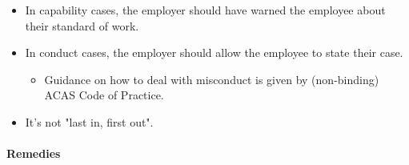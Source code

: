 \documentclass[
]{article}
\providecommand{\tightlist}{%
  \setlength{\itemsep}{0pt}\setlength{\parskip}{0pt}}
\begin{document}
\begin{itemize}
  \begin{itemize}
  \tightlist
  \item
    In capability cases, the employer should have warned the employee
    about their standard of work.
  \item
    In conduct cases, the employer should allow the employee to state
    their case.

    \begin{itemize}
    \tightlist
    \item
      Guidance on how to deal with misconduct is given by (non-binding)
      ACAS Code of Practice.
    \end{itemize}
  \item
    It's not "last in, first out".
  \end{itemize}
\end{itemize}

\hypertarget{remedies}{%
\paragraph{Remedies}\label{remedies}}
\end{document}
